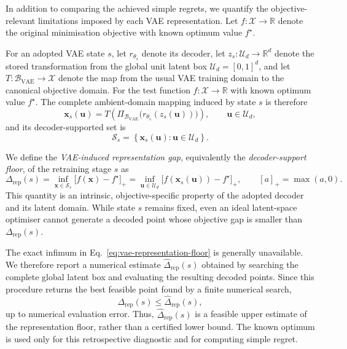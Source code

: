 \documentclass[pdflatex,sn-mathphys-num]{sn-jnl}%
\theoremstyle{thmstyleone}%
\theoremstyle{thmstyletwo}%
\theoremstyle{thmstylethree}%
\begin{document}
In addition to comparing the achieved simple regrets, we quantify the objective-relevant limitations imposed by each VAE representation. Let
$f:\mathcal X\rightarrow\mathbb R$ denote the original minimisation objective
with known optimum value $f^\star$. 

For an adopted VAE state $s$, let $r_{\theta_s}$ denote its decoder, let $z_s:\mathcal U_d\rightarrow\mathbb R^d$ denote the stored transformation from the global unit latent box $\mathcal U_d=[0,1]^d$, and let $T:\mathcal B_{\mathrm{VAE}}\rightarrow\mathcal X$ denote the map from the usual VAE training domain to the canonical objective domain. For the test function $f:\mathcal X\rightarrow\mathbb R$ with known optimum value $f^\star$. The complete ambient-domain mapping induced by state $s$ is therefore
\begin{equation}
  \mathbf{x}_s(\mathbf{u})
  =
  T\!\left(
    \Pi_{\mathcal B_{\mathrm{VAE}}}
    \bigl(r_{\theta_s}(z_s(\mathbf{u}))\bigr)
  \right),
  \qquad \mathbf{u} \in\mathcal U_d,
\end{equation}
and its decoder-supported set is
\begin{equation}
  \mathcal S_s
  =
  \left\{\mathbf{x}_s(\mathbf{u}): \mathbf{u}\in\mathcal U_d\right\}.
\end{equation}

We define the \emph{VAE-induced representation gap}, equivalently the \emph{decoder-support floor}, of the retraining stage $s$ as
\begin{equation}
  \Delta_{\mathrm{rep}}(s)
  =
  \inf_{\mathbf{x}\in\mathcal S_s}
  \bigl[f(\mathbf{x})-f^\star\bigr]_+
  =
  \inf_{\mathbf{u} \in\mathcal U_d}
  \bigl[f(\mathbf{x}_s(\mathbf{u}))-f^\star\bigr]_+,
  \qquad
  [a]_+=\max(a,0).
  \label{eq:vae-representation-floor}
\end{equation}
This quantity is an intrinsic, objective-specific property of the adopted decoder and its latent domain. While state $s$ remains fixed, even an ideal latent-space optimiser cannot generate a decoded point whose objective gap is smaller than $\Delta_{\mathrm{rep}}(s)$.

The exact infimum in Eq.~\eqref{eq:vae-representation-floor} is generally unavailable. We therefore report a numerical estimate $\widehat{\Delta}_{\mathrm{rep}}(s)$ obtained by searching the complete global latent box and evaluating the resulting decoded points. Since this procedure returns the best feasible point found by a finite numerical search,
\begin{equation}
  \Delta_{\mathrm{rep}}(s)
  \leq
  \widehat{\Delta}_{\mathrm{rep}}(s),
\end{equation}
up to numerical evaluation error. Thus, $\widehat{\Delta}_{\mathrm{rep}}(s)$ is a feasible upper estimate of the representation floor, rather than a certified lower bound. The known optimum is used only for this retrospective diagnostic and for computing simple regret.
\end{document}
